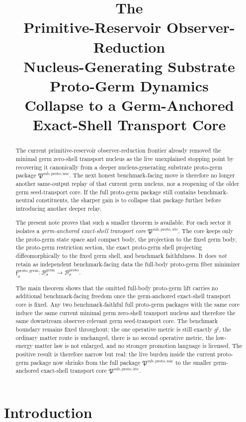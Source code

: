 \documentclass[11pt]{article}
\title{\textbf{The \TheoryName{}}\\[0.4em]
\large Primitive-Reservoir Observer-Reduction\\
\large Nucleus-Generating Substrate Proto-Germ Dynamics\\
\large Collapse to a Germ-Anchored\\
\large Exact-Shell Transport Core}
\author{}
\date{}
\newcommand{\CompletedMetric}{g^{\sharp}}
\newcommand{\GermBody}[1]{\mathcal B_{#1}^{\mathrm{germ}}}
\newcommand{\ProtoPackage}{\mathfrak P^{\mathrm{sub,proto,nuc}}}
\newcommand{\ProtoTransportCore}{\mathfrak P^{\mathrm{sub,proto,xtc}}}
\newcommand{\ProtoBody}[1]{\mathcal B_{#1}^{\mathrm{proto}}}
\newcommand{\ProtoGermMin}[1]{\mathfrak f_{#1}^{\mathrm{proto,germ}}}
\begin{document}
\maketitle

\begin{abstract}
The current primitive-reservoir observer-reduction frontier already removed the minimal germ zero-shell transport nucleus as the live unexplained stopping point by recovering it canonically from a deeper nucleus-generating substrate proto-germ package \(\ProtoPackage\). The next honest benchmark-facing move is therefore no longer another same-output replay of that current germ nucleus, nor a reopening of the older germ seed-transport core. If the full proto-germ package still contains benchmark-neutral constituents, the sharper gain is to collapse that package further before introducing another deeper relay.

The present note proves that such a smaller theorem is available. For each sector it isolates a \emph{germ-anchored exact-shell transport core} \(\ProtoTransportCore\). The core keeps only the proto-germ state space and compact body, the projection to the fixed germ body, the proto-germ restriction section, the exact proto-germ shell projecting diffeomorphically to the fixed germ shell, and benchmark faithfulness. It does \emph{not} retain as independent benchmark-facing data the full-body proto-germ fiber minimizer \(\ProtoGermMin{\sigma}:\GermBody{\sigma}\to\ProtoBody{\sigma}\).

The main theorem shows that the omitted full-body proto-germ lift carries no additional benchmark-facing freedom once the germ-anchored exact-shell transport core is fixed. Any two benchmark-faithful full proto-germ packages with the same core induce the same current minimal germ zero-shell transport nucleus and therefore the same downstream observer-relevant germ seed-transport core. The benchmark boundary remains fixed throughout: the one operative metric is still exactly \(\CompletedMetric\), the ordinary matter route is unchanged, there is no second operative metric, the low-energy matter law is not enlarged, and no stronger promotion language is licensed. The positive result is therefore narrow but real: the live burden inside the current proto-germ package now shrinks from the full package \(\ProtoPackage\) to the smaller germ-anchored exact-shell transport core \(\ProtoTransportCore\).
\end{abstract}

\section{Introduction}
\end{document}
